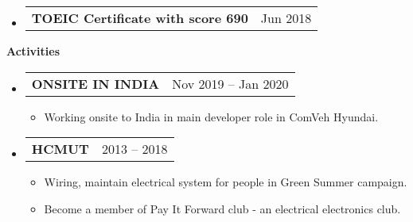 \documentclass[letterpaper,12pt]{article}[leftmargin=*]
\makeatletter
\def \entryspacing {5pt}
\renewcommand{\section}[2]{\vspace{5pt}
  \colorbox{secondary}{\color{white}\raggedbottom\normalsize\textbf{{#1}{\hspace{7pt}#2}}}
}
\newcommand{\resumeEntryStart}{\begin{itemize}[leftmargin=2.5mm]}
\newcommand{\resumeEntryEnd}{\end{itemize}\vspace{\entryspacing}}
\newcommand{\resumeItemListStart}{\begin{itemize}[leftmargin=4.5mm]}
\newcommand{\resumeItemListEnd}{\end{itemize}}
\newcommand{\resumeItem}[1]{
  \item\small{
    {#1 \vspace{-2pt}}
  }
}
\newcommand{\resumeEntryTD}[2]{
  \vspace{1pt}\item[]
    \begin{tabularx}{0.97\textwidth}{X@{\hspace{60pt}}r}
      \textbf{\color{primary}#1} & {\firabook\color{accent}\small#2} \\
    \end{tabularx}\vspace{-6pt}
}
\makeatother
\begin{document}
  \resumeEntryStart
    \resumeEntryTD
      {TOEIC Certificate with score 690}{Jun 2018}
  \resumeEntryEnd

\section{\faWalking}{Activities}
  \resumeEntryStart
    \resumeEntryTD
      {ONSITE IN INDIA}{Nov 2019 -- Jan 2020}
    \resumeItemListStart
      \resumeItem {Working onsite to India in main developer role in ComVeh Hyundai.}
    \resumeItemListEnd
  \resumeEntryEnd
  \vspace{-20pt}
  
  \resumeEntryStart
    \resumeEntryTD
      {HCMUT}{2013 -- 2018}
    \resumeItemListStart
      \resumeItem {Wiring, maintain electrical system for people in Green Summer campaign.}
      \resumeItem {Become a member of Pay It Forward club - an electrical electronics club.}
    \resumeItemListEnd
  \resumeEntryEnd
\end{document}
